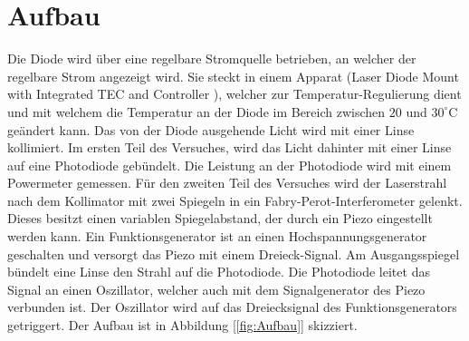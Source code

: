 \documentclass[a4paper,10pt]{scrartcl} %
\begin{document}
\section{Aufbau}
\label{sec:Aufbau}
Die Diode wird über eine regelbare Stromquelle betrieben, an welcher der regelbare Strom angezeigt wird. Sie steckt in einem Apparat (Laser Diode Mount with Integrated TEC and Controller \cite{Mount}), welcher zur Temperatur-Regulierung dient und mit welchem die Temperatur an der Diode im Bereich zwischen $20$ und $30^\circ{\text{C}}$ geändert kann. Das von der Diode ausgehende Licht wird mit einer Linse kollimiert. Im ersten Teil des Versuches, wird das Licht dahinter mit einer Linse auf eine Photodiode gebündelt. Die Leistung an der Photodiode wird mit einem Powermeter gemessen. Für den zweiten Teil des Versuches wird der Laserstrahl nach dem Kollimator mit zwei Spiegeln in ein Fabry-Perot-Interferometer gelenkt. Dieses besitzt einen variablen Spiegelabstand, der durch ein Piezo eingestellt werden kann. Ein Funktionsgenerator ist an einen Hochspannungsgenerator geschalten und versorgt das Piezo mit einem Dreieck-Signal. Am Ausgangsspiegel bündelt eine Linse den Strahl auf die Photodiode. Die Photodiode leitet das Signal an einen Oszillator, welcher auch mit dem Signalgenerator des Piezo verbunden ist. Der Oszillator wird auf das Dreiecksignal des Funktionsgenerators getriggert. Der Aufbau ist in Abbildung [\ref{fig:Aufbau}] skizziert.
\end{document}
